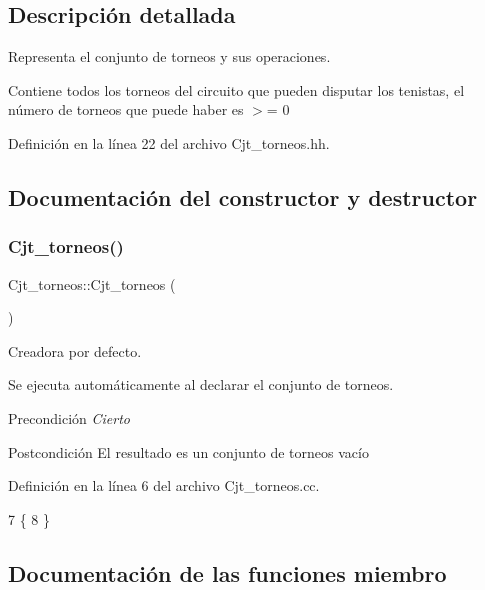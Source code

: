 \subsection{Descripción detallada}
Representa el conjunto de torneos y sus operaciones. 

Contiene todos los torneos del circuito que pueden disputar los tenistas, el número de torneos que puede haber es $>$= 0 

Definición en la línea 22 del archivo Cjt\+\_\+torneos.\+hh.



\subsection{Documentación del constructor y destructor}
\mbox{\label{class_cjt__torneos_acc82582b779afd52bbb92c8094d473ac}} 
\subsubsection{\texorpdfstring{Cjt\+\_\+torneos()}{Cjt\_torneos()}}
{\footnotesize\ttfamily Cjt\+\_\+torneos\+::\+Cjt\+\_\+torneos (\begin{DoxyParamCaption}{ }\end{DoxyParamCaption})}



Creadora por defecto. 

Se ejecuta automáticamente al declarar el conjunto de torneos. \begin{DoxyPrecond}{Precondición}
{\itshape Cierto} 
\end{DoxyPrecond}
\begin{DoxyPostcond}{Postcondición}
El resultado es un conjunto de torneos vacío 
\end{DoxyPostcond}


Definición en la línea 6 del archivo Cjt\+\_\+torneos.\+cc.


\begin{DoxyCode}
7 \{
8 \}
\end{DoxyCode}


\subsection{Documentación de las funciones miembro}
\mbox{\label{class_cjt__torneos_a7385438366fe4d50e6cf82aa6c381c08}} 
